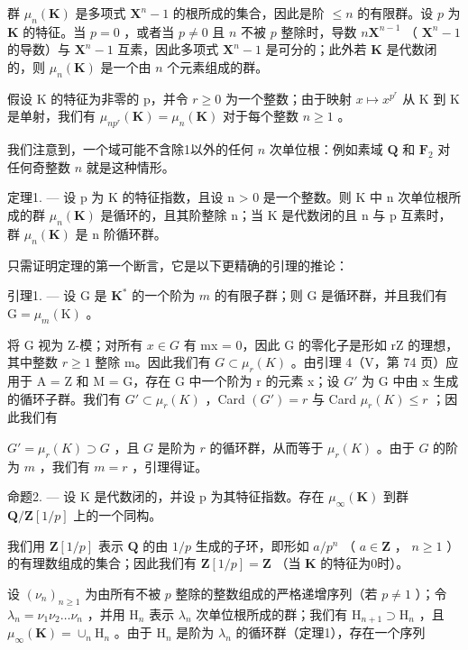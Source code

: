 群 \(\mu_n(\mathbf{K})\) 是多项式 \(\mathbf{X}^n - 1\) 的根所成的集合，因此是阶 \(\leqslant n\) 的有限群。设 \(p\) 为 \(\mathbf{K}\) 的特征。当 \(p = 0\) ，或者当 \(p \neq 0\) 且 \(n\) 不被 \(p\) 整除时，导数 \(n\mathbf{X}^{n-1}\) （ \(\mathbf{X}^n - 1\) 的导数）与 \(\mathbf{X}^n - 1\) 互素，因此多项式 \(\mathbf{X}^n - 1\) 是可分的；此外若 \(\mathbf{K}\) 是代数闭的，则 \(\mu_n(\mathbf{K})\) 是一个由 \(n\) 个元素组成的群。

假设 K 的特征为非零的 p，并令 \(r \geqslant 0\) 为一个整数；由于映射 \(x \mapsto x^{p^{r}}\) 从 K 到 K 是单射，我们有 \(\mu_{np^{r}}(\mathbf{K}) = \mu_n(\mathbf{K})\) 对于每个整数 \(n \geqslant 1\) 。

我们注意到，一个域可能不含除1以外的任何 \(n\) 次单位根：例如素域 \(\mathbf{Q}\) 和 \(\mathbf{F}_2\) 对任何奇整数 \(n\) 就是这种情形。

定理1. --- 设 p 为 K 的特征指数，且设 n \textgreater{} 0 是一个整数。则 K 中 n 次单位根所成的群 \(\mu_{n}(\mathbf{K})\) 是循环的，且其阶整除 n；当 K 是代数闭的且 n 与 p 互素时，群 \(\mu_{n}(\mathbf{K})\) 是 n 阶循环群。

只需证明定理的第一个断言，它是以下更精确的引理的推论：

引理1. --- 设 G 是 \(\mathbf{K}^*\) 的一个阶为 \(m\) 的有限子群；则 G 是循环群，并且我们有 \(\mathrm{G} = \mu_m(\mathrm{K})\) 。

将 G 视为 Z-模；对所有 \(x \in G\) 有 mx = 0，因此 G 的零化子是形如 rZ 的理想，其中整数 \(r \geqslant 1\) 整除 m。因此我们有 \(G \subset \mu_{r}(K)\) 。由引理 4（V，第 74 页）应用于 A = Z 和 M = G，存在 G 中一个阶为 r 的元素 x；设 \(G'\) 为 G 中由 x 生成的循环子群。我们有 \(G' \subset \mu_{r}(K)\) ，Card \((G') = r\) 与 Card \(\mu_{r}(K) \leqslant r\) ；因此我们有

\(G' = \mu_r(K) \supset G\) ，且 \(G\) 是阶为 \(r\) 的循环群，从而等于 \(\mu_r(K)\) 。由于 \(G\) 的阶为 \(m\) ，我们有 \(m = r\) ，引理得证。

命题2. --- 设 K 是代数闭的，并设 p 为其特征指数。存在 \(\mu_{\infty}(\mathbf{K})\) 到群 \(\mathbf{Q}/\mathbf{Z}[1/p]\) 上的一个同构。

我们用 \(\mathbf{Z}[1/p]\) 表示 \(\mathbf{Q}\) 的由 \(1/p\) 生成的子环，即形如 \(a/p^n\) （ \(a \in \mathbf{Z}\) ， \(n \geqslant 1\) ）的有理数组成的集合；因此我们有 \(\mathbf{Z}[1/p] = \mathbf{Z}\) （当 \(\mathbf{K}\) 的特征为0时）。

设 \((\nu_{n})_{n\geqslant 1}\) 为由所有不被 \(p\) 整除的整数组成的严格递增序列（若 \(p\neq 1\) ）；令 \(\lambda_{n} = \nu_{1}\nu_{2}\dots \nu_{n}\) ，并用 \(\mathrm{H}_n\) 表示 \(\lambda_{n}\) 次单位根所成的群；我们有 \(\mathrm{H}_{n + 1}\supset \mathrm{H}_n\) ，且 \(\mu_{\infty}(\mathbf{K}) = \cup_{n}\mathrm{H}_{n}\) 。由于 \(\mathrm{H}_n\) 是阶为 \(\lambda_{n}\) 的循环群（定理1），存在一个序列

